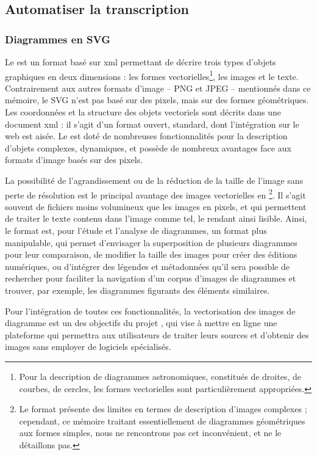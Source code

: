 
\subsection{Automatiser la transcription}
	\subsubsection{Diagrammes en SVG}
	Le \svg est un format basé sur \acrshort{xml} permettant de décrire trois types d'objets graphiques en deux dimensions : les formes vectorielles\footnote{Pour la description de diagrammes astronomiques, constitués de droites, de courbes, de cercles, les formes vectorielles sont particulièrement appropriées.}, les images et le texte. Contrairement aux autres formats d'image -- PNG et JPEG -- mentionnés dans ce mémoire, le SVG n'est pas basé sur des pixels, mais sur des formes géométriques. Les coordonnées et la structure des objets vectoriels sont décrits dans une document \acrshort{xml} : il s'agit d'un format ouvert, standard, dont l'intégration sur le web est aisée. Le \svg est doté de nombreuses fonctionnalités pour la description d'objets complexes, dynamiques, et possède de nombreux avantages face aux formats d'image basés sur des pixels.
	
	La possibilité de l'agrandissement ou de la réduction de la taille de l'image sans perte de résolution est le principal avantage des images vectorielles en \svg\footnote{Le format \svg présente des limites en termes de description d'images complexes ; cependant, ce mémoire traitant essentiellement de diagrammes géométriques aux formes simples, nous ne rencontrons pas cet inconvénient, et ne le détaillons pas.}. Il s'agit souvent de fichiers moins volumineux que les images en pixels, et qui permettent de traiter le texte contenu dans l'image comme tel, le rendant ainsi lisible. Ainsi, le format \svg est, pour l'étude et l'analyse de diagrammes, un format plus manipulable, qui permet d'envisager la superposition de plusieurs diagrammes pour leur comparaison, de modifier la taille des images pour créer des éditions numériques, ou d'intégrer des légendes et métadonnées qu'il sera possible de rechercher pour faciliter la navigation d'un corpus d'images de diagrammes et trouver, par exemple, les diagrammes figurants des éléments similaires.
	
	Pour l'intégration de toutes ces fonctionnalités, la vectorisation des images de diagramme est un des objectifs du projet \eida, qui vise à mettre en ligne une plateforme qui permettra aux utilisateurs de traiter leurs sources et d'obtenir des images \svg sans employer de logiciels spécialisés.
	
